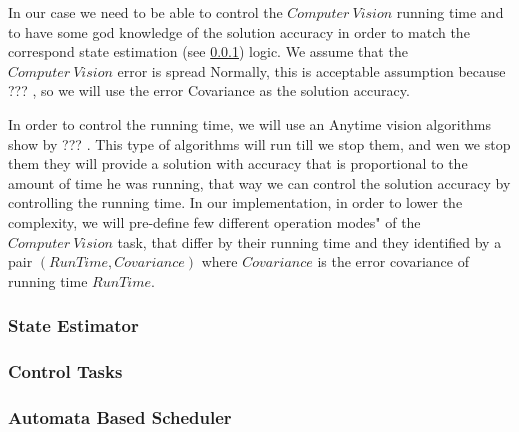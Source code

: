 \documentclass[11pt]{article}
\begin{document}
In our case we need to be able to control the $Computer~Vision$ running time and to have some god knowledge of the solution accuracy in order to match the correspond state estimation (see \ref{sec:estimator}) logic.
We assume that the $Computer~Vision$ error is spread Normally, this is acceptable assumption because ??? \cite{???}, so we will use the error Covariance as the solution accuracy.

In order to control the running time, we will use an Anytime vision algorithms show by ??? \cite{???}.
This type of algorithms will run till we stop them, and wen we stop them they will provide a solution with accuracy that is proportional to the amount of time he was running, that way we can control the solution accuracy by controlling the running time.
In our implementation, in order to lower the complexity, we will pre-define few different operation modes" of the $Computer~Vision$ task, that differ by their running time and they identified by a pair $(RunTime, Covariance)$ where $Covariance$ is the error covariance of running time $RunTime$.

\subsubsection{State Estimator}
\label{sec:estimator}

\subsubsection{Control Tasks}

\subsubsection{Automata Based Scheduler}
\end{document}
